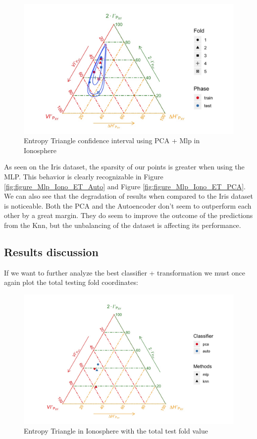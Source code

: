 \begin{figure}[H]
	\centering
	\includegraphics[width=\linewidth]{Figuras_tfg/ET_Iono_PCA_Mlp_Confidence}
	\caption{Entropy Triangle confidence interval using PCA + Mlp in Ionosphere}
	\label{fig:figure_Mlp_Iono_ET_PCA_Confidence}
\end{figure}

As seen on the Iris dataset, the sparsity of our points is greater when using the MLP. This behavior is clearly recognizable in Figure \ref{fig:figure_Mlp_Iono_ET_Auto} and Figure \ref{fig:figure_Mlp_Iono_ET_PCA}. We can also see that the degradation of results when compared to the Iris dataset is noticeable. Both the PCA and the Autoencoder don't seem to outperform each other by a great margin. They do seem to improve the outcome of the predictions from the Knn, but the unbalancing of the dataset is affecting its performance. \par

\subsection{Results discussion}

If we want to further analyze the best classifier + transformation we must once again plot the total testing fold coordinates:

\begin{figure}[H]
	\centering
	\includegraphics[width=1\linewidth]{Figuras_tfg/ET_Iono_Total_Results}
	\caption{Entropy Triangle in Ionosphere with the total test fold value}
	\label{fig:figure_Total_Ionosphere_ET}
\end{figure}

